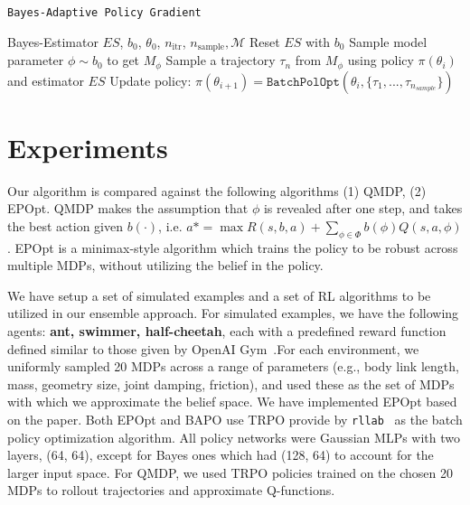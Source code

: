 \documentclass{article}
\DeclareMathOperator*{\argmin}{arg\,min}
\begin{document}
%
%
\begin{algorithm}[tb]
\caption{\texttt{Bayes-Adaptive Policy Gradient}}
\label{algo:bapg}
\begin{algorithmic}[1]
\State Bayes-Estimator $ES$, $b_0$, $\theta_0$, $n_\text{itr}$, $n_\text{sample}, \mathcal{M}$
\vspace{2mm}
    \State Reset $ES$ with $b_0$
    \State Sample model parameter $\phi \sim b_0$ to get $M_{\phi}$
    \State Sample a trajectory $\tau_n$ from $M_{\phi}$ using policy $\pi(\theta_i)$ and estimator $ES$
  \EndFor
\EndFor
\State Update policy: $\pi(\theta_{i+1}) = \texttt{BatchPolOpt}(\theta_i, \{\tau_1, ..., \tau_{n_{sample}}\})$
\end{algorithmic}
\end{algorithm}

\section{Experiments}

Our algorithm is compared against the following algorithms  (1) QMDP, (2) EPOpt. QMDP makes the assumption that $\phi$ is revealed after one step, and takes the best action given $b(\cdot)$, i.e. $a* = \max R(s,b,a) + \sum_{\phi\in\Phi} b(\phi)Q(s,a,\phi)$. EPOpt is a minimax-style algorithm which trains the policy to be robust across multiple MDPs, without utilizing the belief in the policy.

We have setup a set of simulated examples and a set of RL algorithms to be utilized in our ensemble approach. For simulated examples, we have the following agents: \textbf{ant, swimmer, half-cheetah}, each with a predefined reward function defined similar to those given by OpenAI Gym~\cite{openai}.For each environment, we uniformly sampled 20 MDPs across a range of parameters (e.g., body link length, mass, geometry size, joint damping, friction), and used these as the set of MDPs with which we approximate the belief space.  We have implemented EPOpt based on the paper. Both EPOpt and BAPO use TRPO provide by \texttt{rllab}~\cite{duan2016benchmarking} as the batch policy optimization algorithm. All policy networks were Gaussian MLPs with two layers, (64, 64), except for Bayes ones which had (128, 64) to account for the larger input space. For QMDP, we used TRPO policies trained on the chosen 20 MDPs to rollout trajectories and approximate Q-functions.
\end{document}
